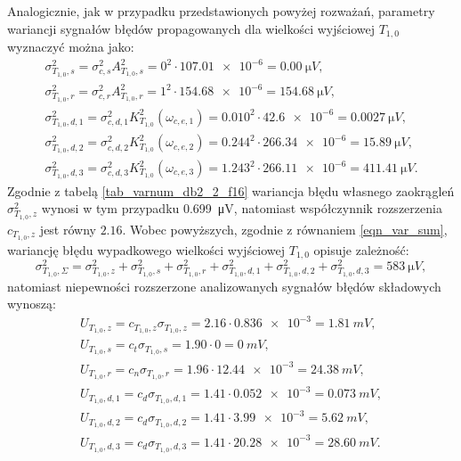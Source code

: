 Analogicznie, jak w przypadku przedstawionych powyżej rozważań, parametry wariancji sygnałów błędów propagowanych dla wielkości wyjściowej $T_{1,0}$ wyznaczyć można jako:
\begin{gather}
\sigma_{T_{1,0},s}^{2} = \sigma_{c,s}^{2} A_{T_{1,0},s}^{2} = 0^{2} \cdot \num{107.01e-6} = \qty{0.00}{\micro V} \label{eqn_sym_partd_output_var_stat_T_1_0}, \\
\sigma_{T_{1,0},r}^{2} = \sigma_{c,r}^{2} A_{T_{1,0},r}^{2} = 1^{2} \cdot \num{154.68e-6} = \qty{154.68}{\micro V} \label{eqn_sym_partd_output_var_rand_T_1_0}, \\
\sigma_{T_{1,0},d,1}^{2} = \sigma_{c,d,1}^{2} K_{T_{1,0}}^{2} \left( \omega_{c,e,1} \right) = {0.010}^{2} \cdot \num{42.6e-6} = \qty{0.0027}{\micro V} \label{eqn_sym_partd_output_var_dyn_1_T_1_0}, \\
\sigma_{T_{1,0},d,2}^{2} = \sigma_{c,d,2}^{2} K_{T_{1,0}}^{2}\left(\omega_{c,e,2}\right) = {0.244}^{2} \cdot \num{266.34e-6} = \qty{15.89}{\micro V} \label{eqn_sym_partd_output_var_dyn_2_T_1_0}, \\
\sigma_{T_{1,0},d,3}^{2} = \sigma_{c,d,3}^{2} K_{T_{1,0}}^{2} \left( \omega_{c,e,3} \right) = {1.243}^{2} \cdot \num{266.11e-6} = \qty{411.41}{\micro V} \label{eqn_sym_partd_output_var_dyn_3_T_1_0}.
\end{gather}
Zgodnie z tabelą \ref{tab_varnum_db2_2_f16} wariancja błędu własnego zaokrągleń $\sigma_{T_{1,0},z}^{2}$ wynosi w tym przypadku \qty{0.699}{\micro V}, natomiast współczynnik rozszerzenia $c_{T_{1,0},z}$ jest równy $2.16$. Wobec powyższych, zgodnie z równaniem \eqref{eqn_var_sum}, wariancję błędu wypadkowego wielkości wyjściowej $T_{1,0}$ opisuje zależność:
\begin{equation}
\sigma_{T_{1,0},\Sigma}^{2} = \sigma_{T_{1,0},z}^{2} + \sigma_{T_{1,0},s}^{2} + \sigma_{T_{1,0},r}^{2} + \sigma_{T_{1,0},d,1}^{2} + \sigma_{T_{1,0},d,2}^{2} + \sigma_{T_{1,0},d,3}^{2} = \qty{583}{\micro V} \label{eqn_sym_partd_output_var_sum_T_1_0},
\end{equation}
natomiast niepewności rozszerzone analizowanych sygnałów błędów składowych wynoszą:
\begin{gather}
U_{T_{1,0},z} = c_{T_{1,0},z} \sigma_{T_{1,0},z} = 2.16 \cdot \num{0.836e-3} = \qty{1.81}{mV} \label{eqn_sym_partd_output_unc_roun_T_1_0},\\
U_{T_{1,0},s} = c_{t} \sigma_{T_{1,0},s} = 1.90 \cdot \num{0} = \qty{0}{mV} \label{eqn_sym_partd_output_unc_stat_T_1_0}, \\
U_{T_{1,0},r} = c_{n} \sigma_{T_{1,0},r} = 1.96 \cdot \num{12.44e-3} = \qty{24.38}{mV} \label{eqn_sym_partd_output_unc_rand_T_1_0}, \\
U_{T_{1,0},d,1} = c_{d} \sigma_{T_{1,0},d,1} = 1.41 \cdot \num{0.052e-3} = \qty{0.073}{mV} \label{eqn_sym_partd_output_unc_dyn_1_T_1_0}, \\
U_{T_{1,0},d,2} = c_{d} \sigma_{T_{1,0},d,2} = 1.41 \cdot \num{3.99e-3} = \qty{5.62}{mV} \label{eqn_sym_partd_output_unc_dyn_2_T_1_0}, \\
U_{T_{1,0},d,3} = c_{d} \sigma_{T_{1,0},d,3} = 1.41 \cdot \num{20.28e-3} = \qty{28.60}{mV} \label{eqn_sym_partd_output_unc_dyn_3_T_1_0}.
\end{gather}

